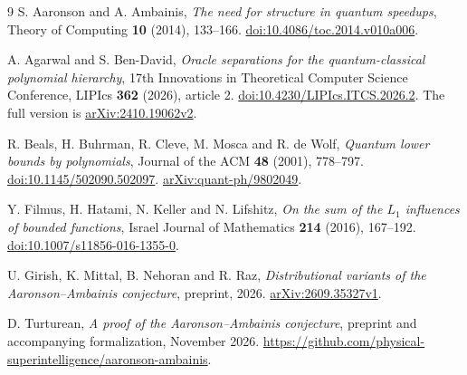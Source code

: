 \documentclass[11pt,reqno]{amsart}
\theoremstyle{definition}
\theoremstyle{remark}
\numberwithin{equation}{section}
\begin{document}
\begin{thebibliography}{9}
S. Aaronson and A. Ambainis,
\emph{The need for structure in quantum speedups},
Theory of Computing \textbf{10} (2014), 133--166.
\href{https://doi.org/10.4086/toc.2014.v010a006}{doi:10.4086/toc.2014.v010a006}.

A. Agarwal and S. Ben-David,
\emph{Oracle separations for the quantum-classical polynomial hierarchy},
17th Innovations in Theoretical Computer Science Conference,
LIPIcs \textbf{362} (2026), article 2.
\href{https://doi.org/10.4230/LIPIcs.ITCS.2026.2}{doi:10.4230/LIPIcs.ITCS.2026.2}.
The full version is \href{https://arxiv.org/abs/2410.19062v2}{arXiv:2410.19062v2}.

R. Beals, H. Buhrman, R. Cleve, M. Mosca and R. de Wolf,
\emph{Quantum lower bounds by polynomials},
Journal of the ACM \textbf{48} (2001), 778--797.
\href{https://doi.org/10.1145/502090.502097}{doi:10.1145/502090.502097}.
\href{https://arxiv.org/abs/quant-ph/9802049}{arXiv:quant-ph/9802049}.

Y. Filmus, H. Hatami, N. Keller and N. Lifshitz,
\emph{On the sum of the $L_1$ influences of bounded functions},
Israel Journal of Mathematics \textbf{214} (2016), 167--192.
\href{https://doi.org/10.1007/s11856-016-1355-0}{doi:10.1007/s11856-016-1355-0}.

U. Girish, K. Mittal, B. Nehoran and R. Raz,
\emph{Distributional variants of the Aaronson--Ambainis conjecture},
preprint, 2026.
\href{https://arxiv.org/abs/2609.35327v1}{arXiv:2609.35327v1}.

D. Turturean,
\emph{A proof of the Aaronson--Ambainis conjecture},
preprint and accompanying formalization, November 2026.
\url{https://github.com/physical-superintelligence/aaronson-ambainis}.
\end{thebibliography}
\end{document}
